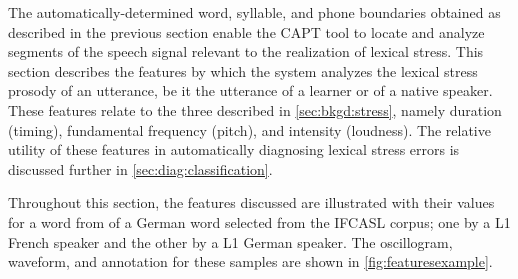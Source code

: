 	The automatically-determined word, syllable, and phone boundaries obtained as described in the previous section 
	enable the CAPT tool to locate and analyze segments of the speech signal relevant to the realization of lexical stress.
	This section describes the features by which the system analyzes the lexical stress prosody of an utterance, be it the utterance of a learner or of a native speaker. These features relate to the three  described in \cref{sec:bkgd:stress}, namely duration (timing), fundamental frequency (pitch), and intensity (loudness). 
	The relative utility of these features in automatically diagnosing lexical stress errors is discussed further in \cref{sec:diag:classification}.
%
%	



	Throughout this section, the features discussed are illustrated with their values for a word from  of a German word selected from the IFCASL corpus; one by a L1 French speaker and the other by a L1 German speaker. The oscillogram, waveform, and annotation for these samples are shown in \cref{fig:featuresexample}.
	
